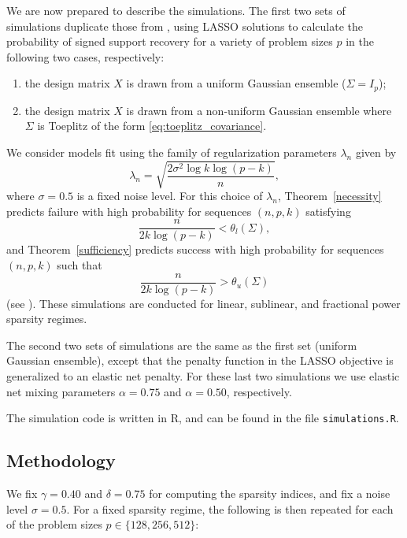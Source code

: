 \documentclass[letterpaper,12pt]{article}
\begin{document}
We are now prepared to describe the simulations. The first two sets of
simulations duplicate those from \cite{wainwright06}, using LASSO
solutions to calculate the probability of signed support recovery for
a variety of problem sizes $p$ in the following two cases,
respectively:
\begin{enumerate}
\item the design matrix $X$ is drawn from a uniform Gaussian ensemble
  ($\Sigma = I_p$);
\item the design matrix $X$ is drawn from a non-uniform Gaussian
  ensemble where $\Sigma$ is Toeplitz of the form
  \eqref{eq:toeplitz_covariance}.
\end{enumerate}
We consider models fit using the family of regularization parameters
$\lambda_n$ given by
\begin{equation*}
  \lambda_n = \sqrt{\frac{2\sigma^2 \log k \log(p - k)}{n}},
\end{equation*}
where $\sigma = 0.5$ is a fixed noise level. For this choice of
$\lambda_n$, Theorem~\ref{necessity} predicts failure with high
probability for sequences $(n, p, k)$ satisfying
\begin{equation*}
  \frac{n}{2k \log(p - k)} < \theta_l(\Sigma),
\end{equation*}
and Theorem~\ref{sufficiency} predicts success with high probability
for sequences $(n, p, k)$ such that
\begin{equation*}
  \frac{n}{2k \log(p - k)} > \theta_u(\Sigma)
\end{equation*}
(see \cite{wainwright06}). These simulations are conducted for linear,
sublinear, and fractional power sparsity regimes.

The second two sets of simulations are the same as the first set
(uniform Gaussian ensemble), except that the penalty function in the
LASSO objective is generalized to an elastic net penalty. For these
last two simulations we use elastic net mixing parameters
$\alpha = 0.75$ and $\alpha = 0.50$, respectively.

The simulation code is written in R, and can be found in the file
\texttt{simulations.R}.

\subsection*{Methodology}

We fix $\gamma = 0.40$ and $\delta = 0.75$ for computing the sparsity
indices, and fix a noise level $\sigma = 0.5$. For a fixed sparsity
regime, the following is then repeated for each of the problem sizes
$p \in \{128, 256, 512\}$:
\end{document}
